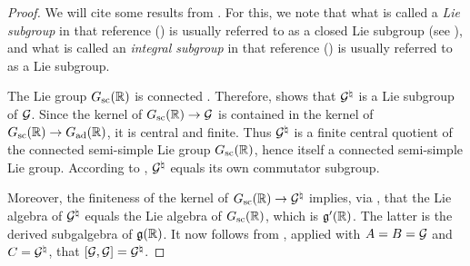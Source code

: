 \documentclass{article}
\theoremstyle{definition}
\numberwithin{equation}{section}
\renewcommand{\-}{\hyp{}}
\begin{document}
\begin{proof}
	We will cite some results from \cite{BourLie1-3}. For this, we note that what is called a \emph{Lie subgroup} in that reference (\cite[Chapter III, \S1, no. 3, Definition 3]{BourLie1-3}) is usually referred to as a closed Lie subgroup (see \cite[Chapter III, \S1, no. 3, Proposition 5]{BourLie1-3}), and what is called an \emph{integral subgroup} in that reference (\cite[Chapter III, \S6, no. 2, Definition 1]{BourLie1-3}) is usually referred to as a Lie subgroup.

	The Lie group $G_{\textrm{sc}}(\mathbb{R})$ is connected \cite[\S7.2, Proposition 7.6]{PR94}. Therefore, \cite[Chapter III, \S3, no. 2, Corollary 1]{BourLie1-3} shows that $\mathcal{G}^\natural$ is a Lie subgroup of $\mathcal{G}$. Since the kernel of $G_{\textrm{sc}}(\mathbb{R}) \to \mathcal{G}$ is contained in the kernel of $G_{\textrm{sc}}(\mathbb{R}) \to G_{\textrm{ad}}(\mathbb{R})$, it is central and finite. Thus $\mathcal{G}^\natural$ is a finite central quotient of the connected semi-simple Lie group $G_{\textrm{sc}}(\mathbb{R})$, hence itself a connected semi-simple Lie group. According to \cite[Chapter III, \S9, no. 8, Proposition 29]{BourLie1-3}, $\mathcal{G}^\natural$ equals its own commutator subgroup.
	
	Moreover, the finiteness of the kernel of $G_{\textrm{sc}}(\mathbb{R}) \to \mathcal{G}^\natural$ implies, via \cite[Chapter III, \S3, no. 2, Corollary 1]{BourLie1-3}, that the Lie algebra of $\mathcal{G}^\natural$ equals the Lie algebra of $G_{\textrm{sc}}(\mathbb{R})$, which is $\mathfrak{g}'(\mathbb{R})$. The latter is the derived subgalgebra of $\mathfrak{g}(\mathbb{R})$. It now follows from \cite[Chapter III, \S9, no. 2, Proposition 4]{BourLie1-3}, applied with $A=B=\mathcal{G}$ and $C=\mathcal{G}^\natural$, that $[\mathcal{G},\mathcal{G}]=\mathcal{G}^\natural$.


\end{proof}
\end{document}
